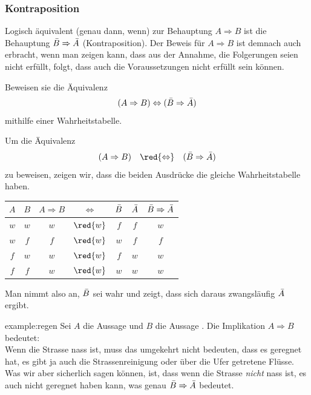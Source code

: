 \subsubsection{Kontraposition}
Logisch äquivalent (genau dann, wenn) zur Behauptung $A\Rightarrow B$ ist die Behauptung $\Bar{B}\Rightarrow \Bar{A}$ (Kontraposition). Der Beweis für $A\Rightarrow B$ ist demnach auch erbracht, wenn man zeigen kann, dass aus der Annahme, die Folgerungen seien nicht erfüllt, folgt, dass auch die Voraussetzungen nicht erfüllt sein können.
\begin{myexercise}%
	\noindent
	Beweisen sie die Äquivalenz
	\begin{align*}
		(A\Rightarrow B) \Leftrightarrow (\Bar{B}\Rightarrow\Bar{A})
	\end{align*}
	mithilfe einer Wahrheitstabelle.
	\vspace{1.3cm}
\end{myexercise}
\begin{myanswer}
	\noindent
	Um die Äquivalenz
	\begin{align*}
		(A\Rightarrow B) \quad \red{\Leftrightarrow} \quad (\Bar{B}\Rightarrow\Bar{A})
	\end{align*}
	zu beweisen, zeigen wir, dass die beiden Ausdrücke die gleiche Wahrheitstabelle haben.
	\begin{table}[H]
		\begin{center}
			\begin{tabular}{c|c|c|c|c|c|c}
				$A$ & $B$ & $A\Rightarrow B$ & $\Leftrightarrow $ & $\Bar{B}$ & $\Bar{A}$ & $\Bar{B}\Rightarrow\Bar{A}$ \\ \hline
				$w$ & $w$ & $w$              & $\red{w}$          & $f$       & $f$       & $w$                         \\
				$w$ & $f$ & $f$              & $\red{w}$          & $w$       & $f$       & $f$                         \\
				$f$ & $w$ & $w$              & $\red{w}$          & $f$       & $w$       & $w$                         \\
				$f$ & $f$ & $w$              & $\red{w}$          & $w$       & $w$       & $w$
			\end{tabular}
		\end{center}
	\end{table}
\end{myanswer}

\noindent
Man nimmt also an, $\Bar{B}$ sei wahr und zeigt, dass sich daraus zwangsläufig $\Bar{A}$ ergibt.
\begin{example}{example:regen}
	Sei $A$ die Aussage  und $B$ die Aussage . Die Implikation $A\Rightarrow B$ bedeutet: \\
	Wenn die Strasse nass ist, muss das umgekehrt nicht bedeuten, dass es geregnet hat, es gibt ja auch die Strassenreinigung oder über die Ufer getretene Flüsse.\\
	Was wir aber sicherlich sagen können, ist, dass wenn die Strasse \textit{nicht} nass ist, es auch nicht geregnet haben kann, was genau
	$\Bar{B}\Rightarrow \Bar{A}$ bedeutet.
\end{example}
